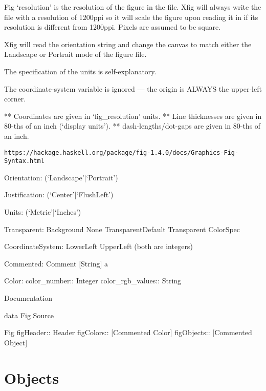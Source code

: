 \documentclass[10pt, a4paper]{article}
\begin{document}
 Fig `resolution' is the resolution of the figure in the file.
    Xfig will always write the file with a resolution of 1200ppi so it
    will scale the figure upon reading it in if its resolution is different
    from 1200ppi.  Pixels are assumed to be square.

    Xfig will read the orientation string and change the canvas to match
    either the Landscape or Portrait mode of the figure file.

    The specification of the units is self-explanatory.

    The coordinate-system variable is ignored --- the origin is ALWAYS the
    upper-left corner.

    ** Coordinates are given in `fig\_resolution' units.
    ** Line thicknesses are given in 80-ths of an inch (`display units').
    ** dash-lengths/dot-gaps are given in 80-ths of an inch.


\begin{Verbatim}[fontsize=\scriptsize]
https://hackage.haskell.org/package/fig-1.4.0/docs/Graphics-Fig-Syntax.html
\end{Verbatim}





Orientation: (`Landscape'|`Portrait')

Justification: (`Center'|`FlushLeft')

Units: (`Metric'|`Inches')





Transparent:
Background	 
None	 
TransparentDefault	 
Transparent ColorSpec	 


CoordinateSystem:
LowerLeft	 
UpperLeft	 
(both are integers)

Commented:
Comment [String] a	 


Color:
color\_number:: Integer
color\_rgb\_values:: String


Documentation

data Fig
Source

Fig	 
figHeader:: Header
figColors:: [Commented Color]
figObjects:: [Commented Object]


\section{Objects}\label{sec:obj}
\end{document}
